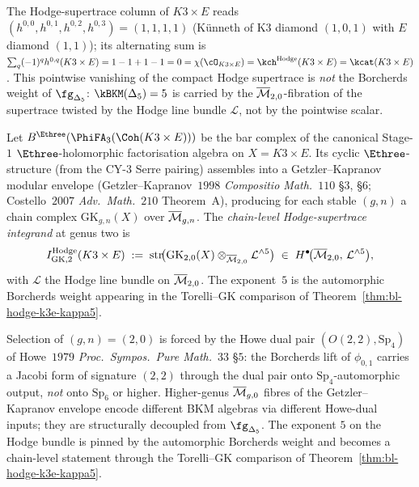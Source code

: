 \begin{remark}
\label{rem:bl-hodge-diamond-pointwise}
The Hodge-supertrace column of $K3 \times E$ reads $(h^{0,0}, h^{0,1}, h^{0,2}, h^{0,3}) = (1, 1, 1, 1)$ (K\"unneth of K3 diamond $(1, 0, 1)$ with $E$ diamond $(1, 1)$); its alternating sum is $\sum_q (-1)^q h^{0, q}(K3 \times E) = 1 - 1 + 1 - 1 = 0 = \chi(\cO_{K3 \times E}) = \kch^{\mathrm{Hodge}}(K3 \times E) = \kcat(K3 \times E)$. This pointwise vanishing of the compact Hodge supertrace is \emph{not} the Borcherds weight of $\fg_{\Delta_5}$: $\kBKM(\Delta_5) = 5$ is carried by the $\overline{\mathcal M}_{2, 0}$-fibration of the supertrace twisted by the Hodge line bundle $\mathcal L$, not by the pointwise scalar.
\end{remark}

\begin{definition}
\label{def:bl-gk-hodge-integrand-k3e}
Let $B^{\Ethree}(\PhiFA_3(\Coh(K3 \times E)))$ be the bar complex of the canonical Stage-$1$ $\Ethree$-holomorphic factorisation algebra on $X = K3 \times E$. Its cyclic $\Ethree$-structure (from the CY-$3$ Serre pairing) assembles into a Getzler--Kapranov modular envelope (Getzler--Kapranov~$1998$ \emph{Compositio Math.}~$110$ \S$3$, \S$6$; Costello~$2007$ \emph{Adv.\ Math.}~$210$ Theorem~A), producing for each stable $(g, n)$ a chain complex $\mathrm{GK}_{g, n}(X)$ over $\overline{\mathcal M}_{g, n}$. The \emph{chain-level Hodge-supertrace integrand} at genus two is
\begin{equation}
\label{eq:bl-hodge-integrand-k3e}
 I^{\mathrm{Hodge}}_{\mathrm{GK}, 2}(K3 \times E)
 \;:=\; \operatorname{str}\!\bigl(
 \mathrm{GK}_{2, 0}(X) \otimes_{\overline{\mathcal M}_{2, 0}} \mathcal L^{\wedge 5}
 \bigr)
 \;\in\; H^\bullet\!\bigl(\overline{\mathcal M}_{2, 0},\, \mathcal L^{\wedge 5}\bigr),
\end{equation}
with $\mathcal L$ the Hodge line bundle on $\overline{\mathcal M}_{2, 0}$. The exponent~$5$ is the automorphic Borcherds weight appearing in the Torelli--GK comparison of Theorem~\ref{thm:bl-hodge-k3e-kappa5}.
\end{definition}

\begin{remark}
Selection of $(g, n) = (2, 0)$ is forced by the Howe dual pair $(O(2, 2), \mathrm{Sp}_4)$ of Howe~$1979$ \emph{Proc.\ Sympos.\ Pure Math.}~$33$ \S$5$: the Borcherds lift of $\phi_{0, 1}$ carries a Jacobi form of signature $(2, 2)$ through the dual pair onto $\mathrm{Sp}_4$-automorphic output, \emph{not} onto $\mathrm{Sp}_6$ or higher. Higher-genus $\overline{\mathcal M}_{g, 0}$ fibres of the Getzler--Kapranov envelope encode different BKM algebras via different Howe-dual inputs; they are structurally decoupled from $\fg_{\Delta_5}$. The exponent $5$ on the Hodge bundle is pinned by the automorphic Borcherds weight and becomes a chain-level statement through the Torelli--GK comparison of Theorem~\ref{thm:bl-hodge-k3e-kappa5}.
\end{remark}

